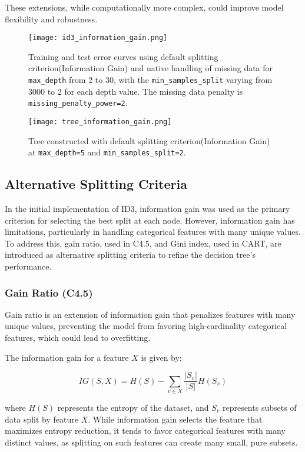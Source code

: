 \documentclass[12pt]{article}
\begin{document}
These extensions, while computationally more complex, could improve model flexibility and robustness.


\begin{figure}[H]
    \centering
    \texttt{[image: id3\_information\_gain.png]}
    \caption{Training and test error curves using default splitting criterion(Information Gain) and native handling of missing data for \texttt{max\_depth} from 2 to 30, with the \texttt{min\_samples\_split} varying from 3000 to 2 for each depth value. The missing data penalty is  \texttt{missing\_penalty\_power=2}.}
    \label{fig:enter-label}
\end{figure}

\begin{figure}[H]
    \centering
    \texttt{[image: tree\_information\_gain.png]}
    \caption{Tree constructed with default splitting criterion(Information Gain) at \texttt{max\_depth=5} and \texttt{min\_samples\_split=2}.}
    \label{fig:enter-label}
\end{figure}


\subsection{Alternative Splitting Criteria}

In the initial implementation of ID3, information gain was used as the primary criterion for selecting the best split at each node. However, information gain has limitations, particularly in handling categorical features with many unique values. To address this, gain ratio, used in C4.5, and Gini index, used in CART, are introduced as alternative splitting criteria to refine the decision tree’s performance.


\subsubsection{Gain Ratio (C4.5)}
Gain ratio is an extension of information gain that penalizes features with many unique values, preventing the model from favoring high-cardinality categorical features, which could lead to overfitting.

The information gain for a feature $X$ is given by:

\begin{equation}
    IG(S, X) = H(S) - \sum_{v \in X} \frac{|S_v|}{|S|} H(S_v)
\end{equation}

where $H(S)$ represents the entropy of the dataset, and $S_v$ represents subsets of data split by feature $X$. While information gain selects the feature that maximizes entropy reduction, it tends to favor categorical features with many distinct values, as splitting on such features can create many small, pure subsets.
\end{document}
